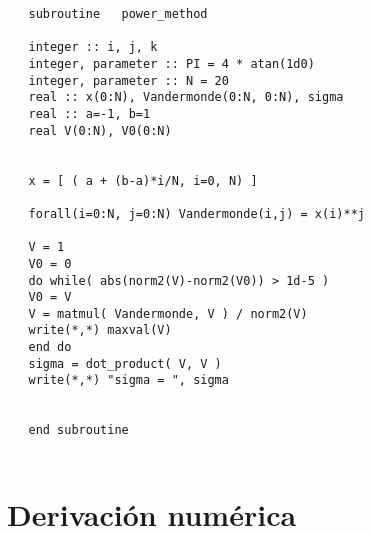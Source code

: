    
   
   \begin{verbatim} 
   subroutine   power_method 
   
   integer :: i, j, k  
   integer, parameter :: PI = 4 * atan(1d0) 
   integer, parameter :: N = 20
   real :: x(0:N), Vandermonde(0:N, 0:N), sigma   
   real :: a=-1, b=1 
   real V(0:N), V0(0:N) 
   
   
   x = [ ( a + (b-a)*i/N, i=0, N) ] 
   
   forall(i=0:N, j=0:N) Vandermonde(i,j) = x(i)**j
   
   V = 1 
   V0 = 0
   do while( abs(norm2(V)-norm2(V0)) > 1d-5 )  
   V0 = V
   V = matmul( Vandermonde, V ) / norm2(V) 
   write(*,*) maxval(V) 
   end do 
   sigma = dot_product( V, V ) 
   write(*,*) "sigma = ", sigma 
   
   
   end subroutine 
   
   \end{verbatim} 
   
   
   
   
   \section{Derivación numérica \label{derivacion_numerica} }
   
